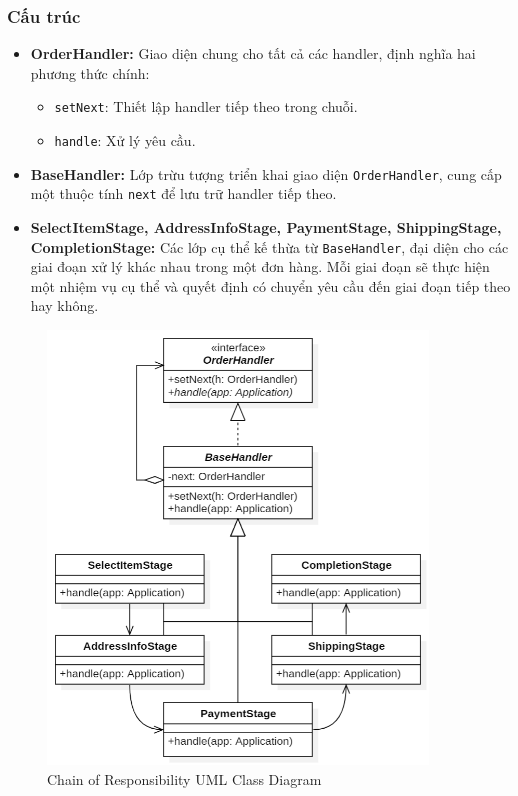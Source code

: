 \subsubsection{Cấu trúc}
\begin{flushleft}
	\begin{itemize}
		\item \textbf{OrderHandler:} Giao diện chung cho tất cả các handler, định nghĩa hai phương thức chính:
		      \begin{itemize}
			      \item \verb|setNext|: Thiết lập handler tiếp theo trong chuỗi.
			      \item \verb|handle|: Xử lý yêu cầu.
		      \end{itemize}
		\item \textbf{BaseHandler:} Lớp trừu tượng triển khai giao diện \verb|OrderHandler|, cung cấp một thuộc tính \verb|next| để lưu trữ handler tiếp theo.
		\item \textbf{SelectItemStage, AddressInfoStage, PaymentStage, ShippingStage, CompletionStage:} Các lớp cụ thể kế thừa từ \verb|BaseHandler|, đại diện cho các giai đoạn xử lý khác nhau trong một đơn hàng. Mỗi giai đoạn sẽ thực hiện một nhiệm vụ cụ thể và quyết định có chuyển yêu cầu đến giai đoạn tiếp theo hay không.
	\end{itemize}

    \begin{figure}[H]
        \centering
        \includegraphics[width=0.9\textwidth]{../assets/screenshots/uml/cor.png}
        \caption{Chain of Responsibility UML Class Diagram}
    \end{figure}
\end{flushleft}

